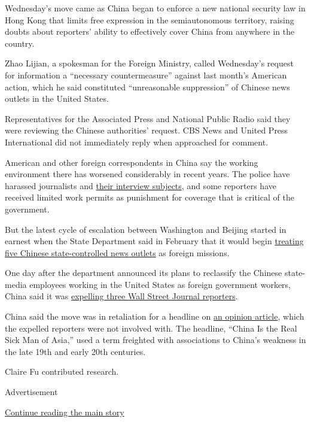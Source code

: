 Wednesday's move came as China began to enforce a new national security
law in Hong Kong that limits free expression in the semiautonomous
territory, raising doubts about reporters' ability to effectively cover
China from anywhere in the country.

Zhao Lijian, a spokesman for the Foreign Ministry, called Wednesday's
request for information a ``necessary countermeasure'' against last
month's American action, which he said constituted ``unreasonable
suppression'' of Chinese news outlets in the United States.

Representatives for the Associated Press and National Public Radio said
they were reviewing the Chinese authorities' request. CBS News and
United Press International did not immediately reply when approached for
comment.

American and other foreign correspondents in China say the working
environment there has worsened considerably in recent years. The police
have harassed journalists and
\href{https://www.nytimes.com/2020/04/16/business/china-coronavirus-censorship.html}{their
interview subjects}, and some reporters have received limited work
permits as punishment for coverage that is critical of the government.

But the latest cycle of escalation between Washington and Beijing
started in earnest when the State Department said in February that it
would begin
\href{https://www.nytimes.com/2020/02/18/world/asia/china-media-trump.html}{treating
five Chinese state-controlled news outlets} as foreign missions.

One day after the department announced its plans to reclassify the
Chinese state-media employees working in the United States as foreign
government workers, China said it was
\href{https://www.nytimes.com/2020/02/19/business/media/china-wall-street-journal.html}{expelling
three Wall Street Journal reporters}.

China said the move was in retaliation for a headline on
\href{https://www.wsj.com/articles/china-is-the-real-sick-man-of-asia-11580773677}{an
opinion article}, which the expelled reporters were not involved with.
The headline, ``China Is the Real Sick Man of Asia,'' used a term
freighted with associations to China's weakness in the late 19th and
early 20th centuries.

Claire Fu contributed research.

Advertisement

\protect\hyperlink{after-bottom}{Continue reading the main story}

